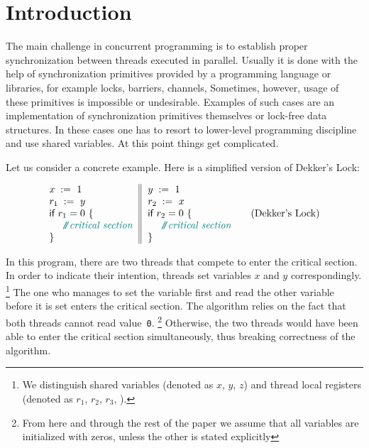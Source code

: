 \section{Introduction}
\label{sec:intro}

The main challenge in concurrent programming is 
to establish proper synchronization between threads executed in parallel.     
Usually it is done with the help of synchronization primitives
provided by a programming language or libraries,
for example locks, barriers, channels, \etc
Sometimes, however, usage of these primitives is impossible or undesirable. 
Examples of such cases are an implementation 
of synchronization primitives themselves
or lock-free data structures.
In these cases one has to resort to 
lower-level programming discipline and use shared variables. 
At this point things get complicated.


Let us consider a concrete example.
Here is a simplified version of Dekker's Lock:

\begin{equation*}
\inarrII{
  \writeInst{}{x}{1} \\
  \readInst{}{r_1}{y}  \\
  \kw{if} {r_1 = 0} ~\{ \\
  ~~ \comment{critical section} \\
  \}
}{
  \writeInst{}{y}{1} \\
  \readInst{}{r_2}{x}  \\
  \kw{if} {r_2 = 0} ~\{ \\
  ~~ \comment{critical section} \\
  \}
}
\tag{Dekker's Lock}\label{ex:Dekker}
\end{equation*}

In this program, there are two threads that compete to enter the critical section.
In order to indicate their intention, threads set 
variables $x$ and $y$ correspondingly.%
\footnote{We distinguish shared variables 
(denoted as $x$, $y$, $z$) and thread local registers 
(denoted as $r_1$, $r_2$, $r_3$, \etc).}
The one who manages to set the variable first 
and read the other variable before it is set
enters the critical section.
The algorithm relies on the fact that both threads cannot read value~\texttt{0}.%
\footnote{From here and through the rest of the paper we assume that all 
variables are initialized with zeros, unless the other is stated explicitly}
Otherwise, the two threads would have been able 
to enter the critical section simultaneously, 
thus breaking correctness of the algorithm.

